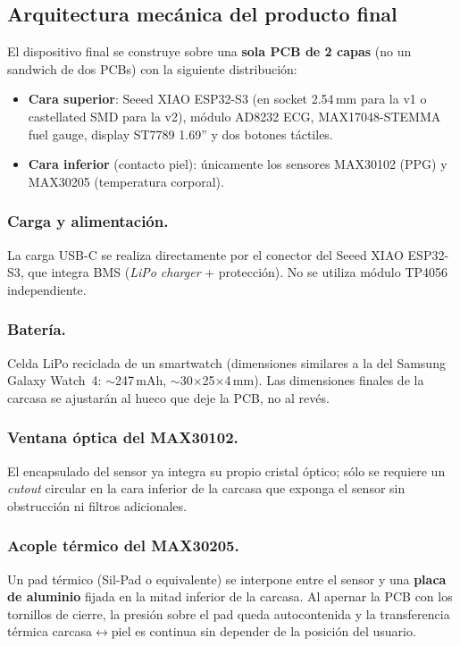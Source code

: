 \documentclass[letterpaper,11pt]{article}
\begin{document}
\subsection{Arquitectura mecánica del producto final}
\label{sec:arq_mecanica}
El dispositivo final se construye sobre una \textbf{sola PCB de 2 capas} (no un sandwich de
dos PCBs) con la siguiente distribución:
\begin{itemize}
    \item \textbf{Cara superior}: Seeed XIAO ESP32-S3 (en socket 2.54\,mm para la v1 o
    castellated SMD para la v2), módulo AD8232 ECG, MAX17048-STEMMA fuel gauge,
    display ST7789 1.69'' y dos botones táctiles.
    \item \textbf{Cara inferior} (contacto piel): únicamente los sensores MAX30102 (PPG) y
    MAX30205 (temperatura corporal).
\end{itemize}

\subsubsection{Carga y alimentación.}
La carga USB-C se realiza directamente por el conector del Seeed XIAO ESP32-S3, que integra
BMS (\textit{LiPo charger} + protección). No se utiliza módulo TP4056 independiente.

\subsubsection{Batería.}
Celda LiPo reciclada de un smartwatch (dimensiones similares a la del Samsung Galaxy
Watch~4: $\sim$247\,mAh, $\sim$30$\times$25$\times$4\,mm). Las dimensiones finales de la
carcasa se ajustarán al hueco que deje la PCB, no al revés.

\subsubsection{Ventana óptica del MAX30102.}
El encapsulado del sensor ya integra su propio cristal óptico; sólo se requiere un
\textit{cutout} circular en la cara inferior de la carcasa que exponga el sensor sin
obstrucción ni filtros adicionales.

\subsubsection{Acople térmico del MAX30205.}
Un pad térmico (Sil-Pad o equivalente) se interpone entre el sensor y una \textbf{placa de
aluminio} fijada en la mitad inferior de la carcasa. Al apernar la PCB con los tornillos de
cierre, la presión sobre el pad queda autocontenida y la transferencia térmica
carcasa$\leftrightarrow$piel es continua sin depender de la posición del usuario.
\end{document}
